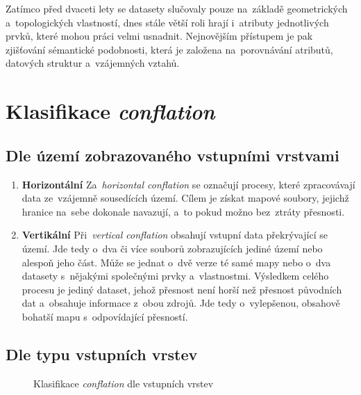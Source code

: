 Zatímco před dvaceti lety se datasety slučovaly pouze na~základě geometric\-kých 
a~topologických vlastností, dnes stále větší roli hrají i~atributy jednotlivých 
prvků, které mohou práci velmi usnadnit. Nejnovějším přístupem je pak zjišťování 
sémantické podobnosti, která je založena na~porovnávání atributů, datových 
struktur a~vzájemných vztahů.


\section{Klasifikace \textit{conflation}}
\label{klasifikace}

\subsection{Dle území zobrazovaného vstupními vrstvami}
\label{dle-uzemi}
\nopagebreak
\begin{enumerate}
  \item \textbf{Horizontální} 
    \subitem Za~\textit{horizontal conflation} se označují procesy, které 
	zpracovávají data ze~vzájemně sousedících území. Cílem je získat 
	mapové soubory, jejichž hranice na~sebe dokonale navazují, a~to pokud 
	možno bez~ztráty přesnosti.
  \item \textbf{Vertikální} \nopagebreak
    \subitem Při~\textit{vertical conflation} obsahují vstupní data překrývající
	se území. Jde tedy o~dva či více souborů zobrazujících jediné území nebo
	alespoň jeho část. Může se jednat o~dvě verze té samé mapy nebo 
	o~dva datasety s~nějakými společnými prvky a~vlastnostmi. Výsledkem 
	celého procesu je jediný dataset, jehož přesnost není horší než přesnost
	původních dat a~obsahuje informace z~obou zdrojů. Jde tedy o~vylepšenou, 
	obsahově bohatší mapu s~odpovídající přesností. 
\end{enumerate}

\subsection{Dle typu vstupních vrstev}
\label{dle-vstupu}

  \begin{figure}[H]
    \centering
      \small
      
      \caption{Klasifikace \textit{conflation} dle vstupních vrstev}
      \label{fig:classification}
  \end{figure}

